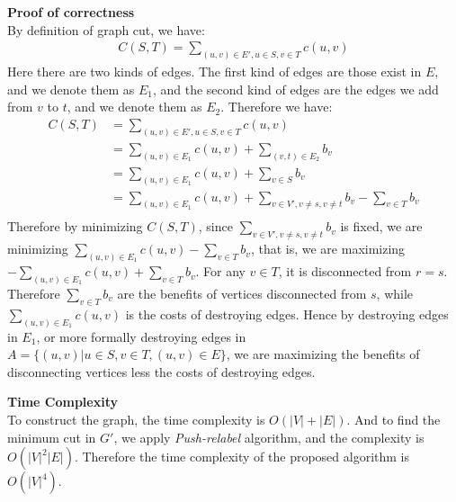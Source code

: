 \documentclass{article}
\newcommand{\Complexity}{\vspace{0.3cm} \noindent\textbf{Time Complexity} \vspace{0.2cm} \\}
\newcommand{\Proof}{\vspace{0.3cm} \noindent\textbf{Proof of correctness} \vspace{0.2cm} \\}
\begin{document}
\Proof
By definition of graph cut, we have:
\begin{align}
  C(S, T) = \sum_{(u, v) \in E', u \in S, v\in T} c(u, v)
\end{align}
Here there are two kinds of edges. The first kind of edges are those exist in $E$, and we denote
them as $E_1$, and the second kind of edges are the edges we add from $v$ to $t$, and we denote them
as $E_2$. Therefore we have:
\begin{align}
  C(S, T) & = \sum_{(u, v) \in E', u \in S, v\in T} c(u, v) \\
  & = \sum_{(u, v) \in E_1} c(u, v) + \sum_{(v, t) \in E_2} b_v \\
  & = \sum_{(u, v) \in E_1} c(u, v) + \sum_{v \in S} b_v \\
  & = \sum_{(u, v) \in E_1} c(u, v) + \sum_{v \in V', v \neq s, v \neq t} b_v  - \sum_{v \in T} b_v \\
\end{align}
Therefore by minimizing $C(S, T)$, since $\sum_{v \in V', v \neq s, v \neq t} b_v$ is fixed,  
we are minimizing $ \sum_{(u, v) \in E_1} c(u, v) - \sum_{v \in T} b_v$, that is, we are maximizing 
$ -\sum_{(u, v) \in E_1} c(u, v) + \sum_{v \in T} b_v$. For any $v \in T$, it is disconnected from
$r = s$. Therefore $\sum_{v \in T} b_v$ are the benefits of vertices disconnected from $s$, while
$\sum_{(u, v) \in E_1} c(u, v)$ is the costs of destroying edges. Hence by destroying edges in 
$E_1$, or more formally destroying edges in  $A = \{(u, v) | u \in S, v\in T, (u, v) \in E\}$, we are
maximizing the benefits of disconnecting vertices less the costs of destroying edges.  

\Complexity
To construct the graph, the time complexity is $O(|V| + |E|)$. And to find the minimum cut in $G'$,
we apply \textit{Push-relabel} algorithm, and the complexity is $O(|V|^2|E|)$. Therefore the time
complexity of the proposed algorithm is $O(|V|^4)$.
\end{document}
